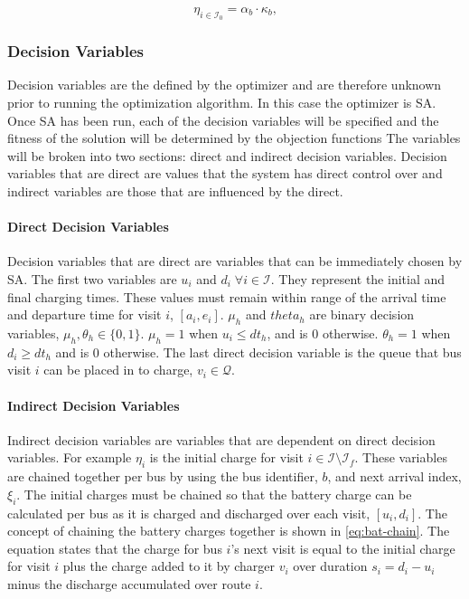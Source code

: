 \documentclass[11pt,a4paper,final]{article}
\newcommand{\Iset}{\mathcal{I}}             %
\newcommand{\Isetinit}{\mathcal{I}_0}       %
\newcommand{\Isetfinal}{\mathcal{I}_f}      %
\newcommand{\Qset}{\mathcal{Q}}             %
\begin{document}
\begin{equation}
\label{eq:batinit}
  \eta_{i \in \Isetinit} = \alpha_b \cdot \kappa_b \text{,}
\end{equation}

\subsubsection{Decision Variables}
\label{sec:decision-variables}
Decision variables are the defined by the optimizer and are therefore unknown prior to running the optimization
algorithm. In this case the optimizer is SA. Once SA has been run, each of the decision variables will be specified and
the fitness of the solution will be determined by the objection functions The variables will be broken into two
sections: direct and indirect decision variables. Decision variables that are direct are values that the system has
direct control over and indirect variables are those that are influenced by the direct.

\paragraph{Direct Decision Variables}
\label{sec:direct-decision-variables}
Decision variables that are direct are variables that can be immediately chosen by SA. The first two variables are \(u_i\)
and \(d_i \; \forall i \in \Iset\). They represent the initial and final charging times. These values must remain within
range of the arrival time and departure time for visit \(i\), \([a_i, e_i]\). \(\mu_h\) and \(theta_h\) are binary decision
variables, \(\mu_h, \theta_h \in \{0, 1\}\). \(\mu_h = 1\) when \(u_i \le dt_h\), and is 0 otherwise. \(\theta_h = 1\) when \(d_i
\ge dt_h\) and is 0 otherwise. The last direct decision variable is the queue that bus visit \(i\) can be placed in to
charge, \(v_i \in \Qset\).

\paragraph{Indirect Decision Variables}
\label{sec:indirect-decision-variables}
Indirect decision variables are variables that are dependent on direct decision variables. For example \(\eta_i\) is the
initial charge for visit \(i \in \Iset \setminus \Isetfinal\). These variables are chained together per bus by using the
bus identifier, \(b\), and next arrival index, \(\xi_i\). The initial charges must be chained so that the battery charge can
be calculated per bus as it is charged and discharged over each visit, \([u_i, d_i]\). The concept of chaining the battery
charges together is shown in \ref{eq:bat-chain}. The equation states that the charge for bus \(i\)'s next visit is equal to the
initial charge for visit \(i\) plus the charge added to it by charger \(v_i\) over duration \(s_i = d_i - u_i\) minus the discharge
accumulated over route \(i\).
\end{document}
